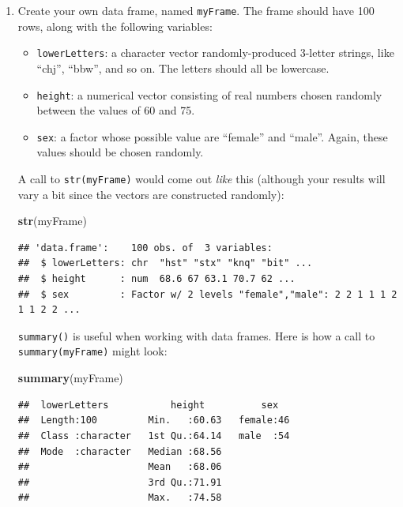 \documentclass[]{book}
\makeatletter
\newenvironment{Shaded}{\begin{snugshade}}{\end{snugshade}}
\newcommand{\KeywordTok}[1]{\textcolor[rgb]{0.13,0.29,0.53}{\textbf{#1}}}
\newcommand{\NormalTok}[1]{#1}
\providecommand{\tightlist}{%
  \setlength{\itemsep}{0pt}\setlength{\parskip}{0pt}}
\newenvironment{kframe}{%
\medskip{}
\setlength{\fboxsep}{.8em}
 \def\at@end@of@kframe{}%
 \ifinner\ifhmode%
  \def\at@end@of@kframe{\end{minipage}}%
  \begin{minipage}{\columnwidth}%
 \fi\fi%
 \def\FrameCommand##1{\hskip\@totalleftmargin \hskip-\fboxsep
 \colorbox{shadecolor}{##1}\hskip-\fboxsep
     \hskip-\linewidth \hskip-\@totalleftmargin \hskip\columnwidth}%
 \MakeFramed {\advance\hsize-\width
   \@totalleftmargin\z@ \linewidth\hsize
   \@setminipage}}%
 {\par\unskip\endMakeFramed%
 \at@end@of@kframe}
\renewenvironment{Shaded}{\begin{kframe}}{\end{kframe}}
\theoremstyle{definition}
\theoremstyle{definition}
\theoremstyle{definition}
\theoremstyle{remark}
\makeatother
\begin{document}
{\begin{enumerate}
  \textbf{Hint}: Use the function \texttt{nrow()}, which gives the
  number of rows of a matrix or data frame.
\item
  Create your own data frame, named \texttt{myFrame}. The frame should
  have 100 rows, along with the following variables:

  \begin{itemize}
  \tightlist
  \item
    \texttt{lowerLetters}: a character vector randomly-produced 3-letter
    strings, like ``chj'', ``bbw'', and so on. The letters should all be
    lowercase.
  \item
    \texttt{height}: a numerical vector consisting of real numbers
    chosen randomly between the values of 60 and 75.
  \item
    \texttt{sex}: a factor whose possible value are ``female'' and
    ``male''. Again, these values should be chosen randomly.
  \end{itemize}

  A call to \texttt{str(myFrame)} would come out \emph{like} this
  (although your results will vary a bit since the vectors are
  constructed randomly):

\begin{Shaded}
\begin{Highlighting}[]
\KeywordTok{str}\NormalTok{(myFrame)}
\end{Highlighting}
\end{Shaded}

\begin{verbatim}
## 'data.frame':    100 obs. of  3 variables:
##  $ lowerLetters: chr  "hst" "stx" "knq" "bit" ...
##  $ height      : num  68.6 67 63.1 70.7 62 ...
##  $ sex         : Factor w/ 2 levels "female","male": 2 2 1 1 1 2 1 1 2 2 ...
\end{verbatim}

  \texttt{summary()} is useful when working with data frames. Here is
  how a call to \texttt{summary(myFrame)} might look:

\begin{Shaded}
\begin{Highlighting}[]
\KeywordTok{summary}\NormalTok{(myFrame)}
\end{Highlighting}
\end{Shaded}

\begin{verbatim}
##  lowerLetters           height          sex    
##  Length:100         Min.   :60.63   female:46  
##  Class :character   1st Qu.:64.14   male  :54  
##  Mode  :character   Median :68.56              
##                     Mean   :68.06              
##                     3rd Qu.:71.91              
##                     Max.   :74.58
\end{verbatim}


\end{enumerate}}
\end{document}
